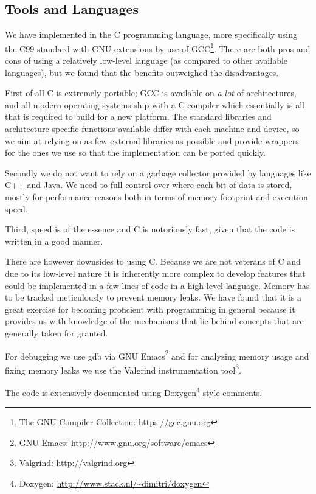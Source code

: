 
\subsection{Tools and Languages}

We have implemented \thename{} in the C programming language, more specifically
using the C99 standard with GNU extensions by use of GCC\footnote{The GNU
  Compiler Collection: \url{https://gcc.gnu.org}}. There are both pros and cons
of using a relatively low-level language (as compared to other available
languages), but we found that the benefits outweighed the disadvantages.

First of all C is extremely portable; GCC is available on \textit{a lot} of
architectures, and all modern operating systems ship with a C compiler which
essentially is all that is required to build \thename{} for a new platform. The
standard libraries and architecture specific functions available differ with
each machine and device, so we aim at relying on as few external libraries as
possible and provide wrappers for the ones we use so that the implementation can
be ported quickly.

Secondly we do not want to rely on a garbage collector provided by languages
like C++ and Java. We need to full control over where each bit of data is
stored, mostly for performance reasons both in terms of memory footprint and
execution speed.

Third, speed is of the essence and C is notoriously fast, given that the code is
written in a good manner.

There are however downsides to using C. Because we are not veterans of C and due
to its low-level nature it is inherently more complex to develop features that
could be implemented in a few lines of code in a high-level language. Memory has
to be tracked meticulously to prevent memory leaks. We have found that it is a
great exercise for becoming proficient with programming in general because it
provides us with knowledge of the mechanisms that lie behind concepts that are
generally taken for granted.

For debugging we use gdb via GNU Emacs\footnote{GNU Emacs:
  \url{http://www.gnu.org/software/emacs}} and for analyzing memory usage and
fixing memory leaks we use the Valgrind instrumentation tool\footnote{Valgrind:
  \url{http://valgrind.org}}.

The code is extensively documented using Doxygen\footnote{Doxygen:
  \url{http://www.stack.nl/~dimitri/doxygen}} style comments.

